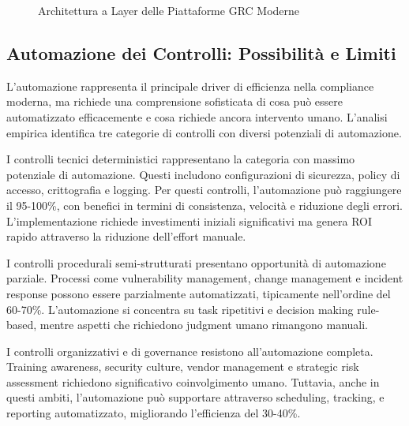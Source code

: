 \begin{figure}[htbp]
\caption{Architettura a Layer delle Piattaforme GRC Moderne}
\label{fig:grc_architecture}
\end{figure}

\subsection{Automazione dei Controlli: Possibilità e Limiti}

L'automazione rappresenta il principale driver di efficienza nella compliance moderna, ma richiede una comprensione sofisticata di cosa può essere automatizzato efficacemente e cosa richiede ancora intervento umano. L'analisi empirica identifica tre categorie di controlli con diversi potenziali di automazione.

I controlli tecnici deterministici rappresentano la categoria con massimo potenziale di automazione. Questi includono configurazioni di sicurezza, policy di accesso, crittografia e logging. Per questi controlli, l'automazione può raggiungere il 95-100\%, con benefici in termini di consistenza, velocità e riduzione degli errori. L'implementazione richiede investimenti iniziali significativi ma genera ROI rapido attraverso la riduzione dell'effort manuale.

I controlli procedurali semi-strutturati presentano opportunità di automazione parziale. Processi come vulnerability management, change management e incident response possono essere parzialmente automatizzati, tipicamente nell'ordine del 60-70\%. L'automazione si concentra su task ripetitivi e decision making rule-based, mentre aspetti che richiedono judgment umano rimangono manuali.

I controlli organizzativi e di governance resistono all'automazione completa. Training awareness, security culture, vendor management e strategic risk assessment richiedono significativo coinvolgimento umano. Tuttavia, anche in questi ambiti, l'automazione può supportare attraverso scheduling, tracking, e reporting automatizzato, migliorando l'efficienza del 30-40\%.

